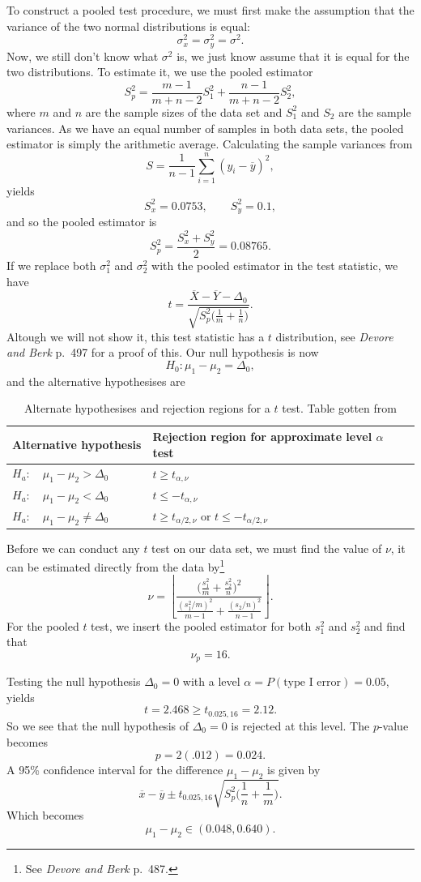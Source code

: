 \documentclass[a4paper, 11pt, titlepage]{article}
\begin{document}
To construct a pooled test procedure, we must first make the assumption that the variance of the two normal distributions is equal:
$$\sigma_x^2 = \sigma_y^2 = \sigma^2.$$
Now, we still don't know what $\sigma^2$ is, we just know assume that it is equal for the two distributions. To estimate it, we use the pooled estimator
$$S_p^2 = \frac{m-1}{m+n-2}S_1^2 + \frac{n-1}{m+n-2}S_2^2,$$
where $m$ and $n$ are the sample sizes of the data set and $S_1^2$ and $S_2$ are the sample variances. As we have an equal number of samples in both data sets, the pooled estimator is simply the arithmetic average. Calculating the sample variances from
$$S = \frac{1}{n-1}\sum_{i=1}^n (y_i - \overline{y})^2,$$
yields
$$S_x^2 = 0.0753, \qquad S_y^2 = 0.1,$$
and so the pooled estimator is
$$S_p^2 = \frac{S_x^2 + S_y^2}{2} = 0.08765.$$
If we replace both $\sigma_1^2$ and $\sigma_2^2$ with the pooled estimator in the test statistic, we have
$$t = \frac{\overline{X} - \overline{Y} - \Delta_0}{\sqrt{S_p^2\bigg(\frac{1}{m} + \frac{1}{n}\bigg)}}.$$
Altough we will not show it, this test statistic has a $t$ distribution, see \emph{Devore and Berk} p.\ 497 for a proof of this. Our null hypothesis is now
$$H_0: \mu_1 - \mu_2 = \Delta_0,$$
and the alternative hypothesises are
\begin{table}[htpb]
\begin{tabular}{l | l}
Alternative hypothesis & Rejection region for approximate level $\alpha$ test \\ \hline
$H_a: \quad \mu_1 -\mu_2 > \Delta_0$ & $t\geq t_{\alpha, \nu}$ \\ \hline
$H_a: \quad \mu_1 -\mu_2 < \Delta_0$ & $t\leq -t_{\alpha, \nu}$ \\ \hline
$H_a: \quad \mu_1 -\mu_2 \neq \Delta_0$ & $t\geq t_{\alpha/2, \nu}$ or $t\leq -t_{\alpha/2, \nu}$ \\ \hline
\end{tabular}
\caption{Alternate hypothesises and rejection regions for a $t$ test. Table gotten from }
\end{table}

Before we can conduct any $t$ test on our data set, we must find the value of $\nu$, it can be estimated directly from the data by\footnote{See \emph{Devore and Berk} p.\ 487.}
$$\nu = \left\lfloor\frac{\bigg(\frac{s_1^2}{m} + \frac{s_2^2}{n}\bigg)^2}{\frac{(s_1^2/m)^2}{m-1} + \frac{(s_2/n)^2}{n-1}}\right\rfloor.$$
For the pooled $t$ test, we insert the pooled estimator for both $s_1^2$ and $s_2^2$ and find that
$$\nu_p = 16.$$

Testing the null hypothesis $\Delta_0 = 0$ with a level $\alpha = P(\mbox{type I error}) = 0.05$, yields
$$t = 2.468 \geq t_{0.025, 16} = 2.12.$$
So we see that the null hypothesis of $\Delta_0 = 0$ is rejected at this level. The $p$-value becomes
$$p = 2(.012) = 0.024.$$
A 95\% confidence interval for the difference $\mu_1 - \mu_2$ is given by
$$\overline{x} - \overline{y} \pm t_{0.025, 16}\sqrt{S_p^2\bigg(\frac{1}{n}+\frac{1}{m}\bigg)}.$$
Which becomes
$$\mu_1 - \mu_2 \in (0.048, 0.640). $$
\end{document}
